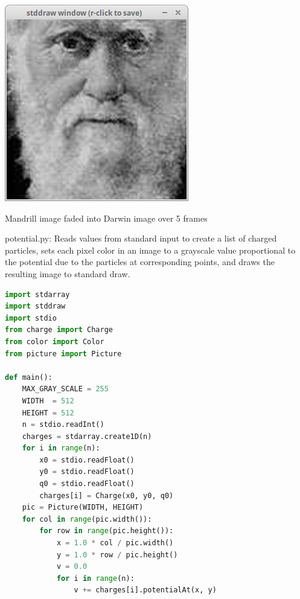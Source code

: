 \documentclass[8pt,a4paper,compress,handout]{beamer}
\begin{document}
\begin{frame}[fragile]
\begin{minipage}{300pt}
\begin{center}
\includegraphics[scale=0.15]{figures/fade6.png}

\smallskip

\tiny Mandrill image faded into Darwin image over 5 frames
\end{center}
\end{minipage}%
\end{frame}

\begin{frame}[fragile]
\begin{framed}
\tiny potential.py: Reads values from standard input to create a list of charged particles, sets each pixel color in an image to a grayscale value proportional to the potential due to the particles at corresponding points, and draws the resulting image to standard draw.
\end{framed}

\begin{lstlisting}[language=Python]
import stdarray
import stddraw
import stdio
from charge import Charge
from color import Color
from picture import Picture

def main():
    MAX_GRAY_SCALE = 255
    WIDTH  = 512
    HEIGHT = 512
    n = stdio.readInt()
    charges = stdarray.create1D(n)
    for i in range(n):
        x0 = stdio.readFloat()
        y0 = stdio.readFloat()
        q0 = stdio.readFloat()
        charges[i] = Charge(x0, y0, q0)
    pic = Picture(WIDTH, HEIGHT)
    for col in range(pic.width()):
        for row in range(pic.height()):
            x = 1.0 * col / pic.width()
            y = 1.0 * row / pic.height()
            v = 0.0
            for i in range(n):
                v += charges[i].potentialAt(x, y)    
\end{lstlisting}
\end{frame}
\end{document}
